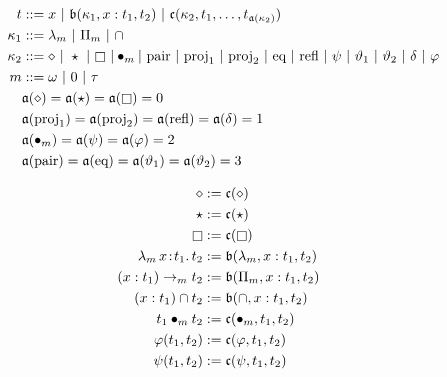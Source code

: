 
\begin{figure}
    \centering
    \begin{align*}
        t &::= x\ |\ \mathfrak{b}(\kappa_1, x : t_1, t_2)\ |\ \mathfrak{c}(\kappa_2, t_1, \ldots, t_{\mathfrak{a}(\kappa_2)}) \\
        \kappa_1 &::= \lambda_m\ |\ \Pi_m\ |\ \cap \\
        \kappa_2 &::=\diamond\ |\ \star\ |\ \kind\ | \bullet_m |\ \text{pair}\ |\ \text{proj}_1\ |\ \text{proj}_2\ |\ \text{eq}\ |\ \text{refl}\ |\ \psi\ |\ \vartheta_1\ |\ \vartheta_2\ |\ \delta\ |\ \varphi  \\
        m &::= \omega\ |\ 0\ |\ \tau \\
        &\mathfrak{a}(\diamond) = \mathfrak{a}(\star) = \mathfrak{a}(\kind) = 0 \\
        &\mathfrak{a}(\text{proj}_1) = \mathfrak{a}(\text{proj}_2) = \mathfrak{a}(\text{refl}) = \mathfrak{a}(\delta) = 1 \\
        &\mathfrak{a}(\bullet_m) = \mathfrak{a}(\psi) = \mathfrak{a}(\varphi) = 2 \\
        &\mathfrak{a}(\text{pair}) = \mathfrak{a}(\text{eq}) = \mathfrak{a}(\vartheta_1) = \mathfrak{a}(\vartheta_2) = 3
    \end{align*}
    \vspace{-.4in}
    \begin{minipage}{0.5\textwidth}
        \begin{align*}
            \diamond &:= \mathfrak{c}(\diamond) \\
            \star &:= \mathfrak{c}(\star) \\
            \kind &:= \mathfrak{c}(\kind) \\
            \abs{\lambda_m}{x}{t_1}{t_2} &:= \mathfrak{b}(\lambda_m, x : t_1, t_2) \\
            (x : t_1) \to_m t_2 &:= \mathfrak{b}(\Pi_m, x : t_1, t_2) \\
            (x : t_1) \cap t_2 &:= \mathfrak{b}(\cap, x : t_1, t_2) \\
            t_1 \bullet_m t_2 &:= \mathfrak{c}(\bullet_m, t_1, t_2) \\
            \varphi(t_1, t_2) &:= \mathfrak{c}(\varphi, t_1, t_2) \\
            \psi(t_1, t_2) &:= \mathfrak{c}(\psi, t_1, t_2)
        \end{align*}
    \end{minipage}%
    \begin{minipage}{0.5\textwidth}

\end{minipage}
\end{figure}

